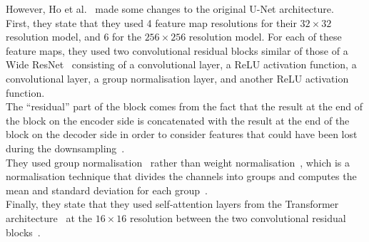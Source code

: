 \documentclass{article}
\numberwithin{equation}{section}
\numberwithin{figure}{section}
\begin{document}
However, Ho et al.~\cite{ho2020denoising} made some changes to the original U-Net architecture. \\
First, they state that they used 4 feature map resolutions for their $32 \times 32$ resolution model, and 6 for the $256 \times 256$ resolution model. For each of these feature maps, they used two convolutional residual blocks similar of those of a Wide ResNet~\cite{zagoruyko2017wide} consisting of a convolutional layer, a ReLU activation function, a convolutional layer, a group normalisation layer, and another ReLU activation function. \\ 
The ``residual'' part of the block comes from the fact that the result at the end of the block on the encoder side is concatenated with the result at the end of the block on the decoder side in order to consider features that could have been lost during the downsampling~\cite{lai2022rethinking}. \\
They used group normalisation~\cite{wu2018group} rather than weight normalisation~\cite{salimans2016weight}, which is a normalisation technique that divides the channels into groups and computes the mean and standard deviation for each group~\cite{ho2020denoising}. \\
Finally, they state that they used self-attention layers from the Transformer architecture~\cite{vaswani2023attention} at the $16 \times 16$ resolution between the two convolutional residual blocks~\cite{ho2020denoising}.
\end{document}
